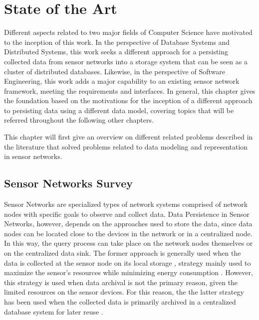 

\chapter{State of the Art}

Different aspects related to two major fields of Computer Science have
motivated to the inception of this work. In the perspective of Database
Systems and Distributed Systems, this work seeks a different approach for a
persisting collected data from sensor networks into a storage system that can
be seen as a cluster of distributed databases. Likewise, in the perspective of
Software Engineering, this work adds a major capability to an existing sensor 
network framework, meeting the requirements and interfaces. In general, this 
chapter gives the foundation based on the motivations for the inception of a 
different approach to persisting data using a different data model, covering 
topics that will be referred throughout the following other chapters.

This chapter will first give an overview on different related problems
described in the literature that solved problems related to data modeling and
representation in sensor networks.

\section{Sensor Networks Survey}

Sensor Networks are specialized types of network systems comprised of network 
nodes with specific goals to observe and collect data. Data Persistence in
Sensor Networks, however, depends on the approaches used to store the data,
since data nodes can be located close to the devices in the network or in a
centralized node. In this way, the query process can take place on the network
nodes themselves or on the centralized data sink. The former approach is
generally used when the data is collected at the sensor node on its local
storage \cite{sn-storage01}\cite{sn-storage03}, strategy mainly used to
maximize the sensor's resources while minimizing energy consumption
\cite{sn-storage04}. However, this strategy is used when data archival is not
the primary reason, given the limited resources on the sensor devices. For
this reason, the the latter strategy has been used when the collected data is
primarily archived in a centralized database system for later reuse
\cite{sn-storage02}.

